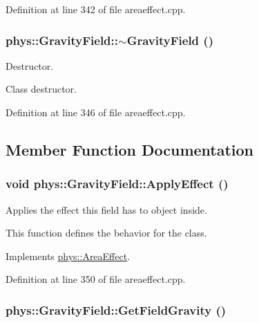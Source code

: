 Definition at line 342 of file areaeffect.cpp.

\hypertarget{classphys_1_1GravityField_ae41a656b247a2982da2e1ae666c605d0}{
\subsubsection[{$\sim$GravityField}]{\setlength{\rightskip}{0pt plus 5cm}phys::GravityField::$\sim$GravityField ()}}
\label{d4/d8a/classphys_1_1GravityField_ae41a656b247a2982da2e1ae666c605d0}


Destructor. 

Class destructor. 

Definition at line 346 of file areaeffect.cpp.



\subsection{Member Function Documentation}
\hypertarget{classphys_1_1GravityField_a0322cb1635bbcb951493d9e17cc9acb1}{
\subsubsection[{ApplyEffect}]{\setlength{\rightskip}{0pt plus 5cm}void phys::GravityField::ApplyEffect ()}}
\label{d4/d8a/classphys_1_1GravityField_a0322cb1635bbcb951493d9e17cc9acb1}


Applies the effect this field has to object inside. 

This function defines the behavior for the class. 

Implements \hyperlink{classphys_1_1AreaEffect_a3b285ecfcf9c9200662d510e48dd222a}{phys::AreaEffect}.



Definition at line 350 of file areaeffect.cpp.

\hypertarget{classphys_1_1GravityField_ae776978b7e8fa1d656bdb216aa6f2d20}{
\subsubsection[{GetFieldGravity}]{ phys::GravityField::GetFieldGravity ()}}
\label{d4/d8a/classphys_1_1GravityField_ae776978b7e8fa1d656bdb216aa6f2d20}


